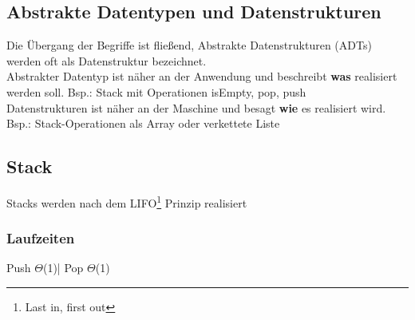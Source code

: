 \documentclass[jou,apacite]{apa6}
\begin{document}
\subsection{Abstrakte Datentypen und Datenstrukturen}
Die Übergang der Begriffe ist fließend, Abstrakte Datenstrukturen (ADTs) werden oft als Datenstruktur bezeichnet.
\\
Abstrakter Datentyp ist näher an der Anwendung und beschreibt {\bfseries was} realisiert werden soll.
\newline 
Bsp.: Stack mit Operationen isEmpty, pop, push
\\
Datenstrukturen ist näher an der Maschine und besagt {\bfseries wie} es realisiert wird.
\\
Bsp.: Stack-Operationen als Array oder verkettete Liste
\subsection{Stack}
Stacks werden nach dem LIFO\footnote{Last in, first out} Prinzip realisiert
\\
\subsubsection{Laufzeiten}
Push    $\Theta$(1)| Pop     $\Theta$(1)
\end{document}
